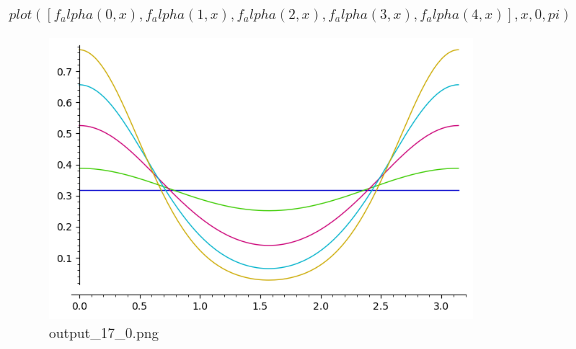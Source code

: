 \documentclass[11pt]{article}
\begin{document}
$plot([f_alpha(0, x), f_alpha(1, x), f_alpha(2, x), f_alpha(3, x), f_alpha(4, x)], x, 0, pi)$

 
            
    

\begin{figure}
\centering
\includegraphics{output_17_0.png}
\caption{output\_17\_0.png}
\end{figure}
    
\end{document}
